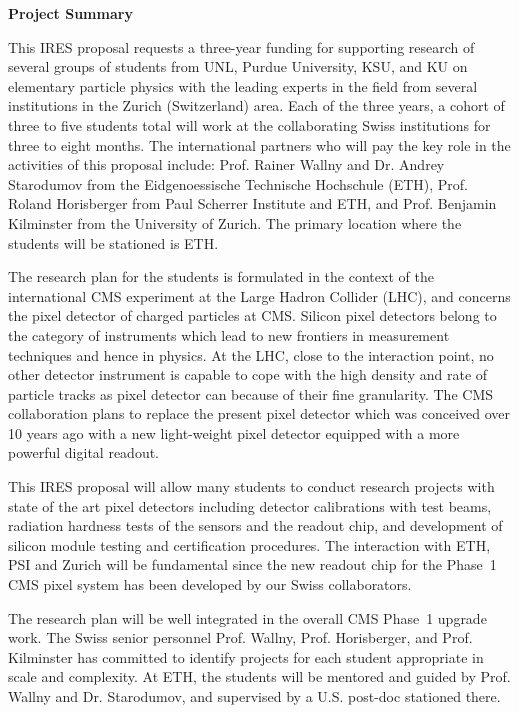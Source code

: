 \documentclass[12pt]{article}
\begin{document}
\pagestyle{empty}

\begin{center}
{\large\bf Project Summary}
\end{center}

This IRES proposal requests a three-year funding for supporting
research of several groups of students from UNL, Purdue University,
KSU, and KU on elementary particle physics with the leading experts in
the field from several institutions in the Zurich (Switzerland)
area. Each of the three years, a cohort of three to five students
total will work at the collaborating Swiss institutions for three to
eight months. The international partners who will pay the key role in
the activities of this proposal include: Prof. Rainer Wallny and
Dr. Andrey Starodumov from the Eidgenoessische Technische Hochschule
(ETH), Prof. Roland Horisberger from Paul Scherrer Institute and ETH,
and Prof. Benjamin Kilminster from the University of Zurich. The
primary location where the students will be stationed is ETH.

The research plan for the students is formulated in the context of the
international CMS experiment at the Large Hadron Collider (LHC), and
concerns the pixel detector of charged particles at CMS. Silicon pixel
detectors belong to the category of instruments which lead to new
frontiers in measurement techniques and hence in physics. At the LHC,
close to the interaction point, no other detector instrument is
capable to cope with the high density and rate of particle tracks as
pixel detector can because of their fine granularity. The CMS
collaboration plans to replace the present pixel detector which was
conceived over 10 years ago
with a new
light-weight pixel detector equipped with a more powerful digital
readout.

This IRES proposal will allow many students to conduct research
projects with state of the art pixel detectors including detector
calibrations with test beams, radiation hardness tests of the sensors
and the readout chip, and development of silicon module testing and
certification procedures. The interaction with ETH, PSI and Zurich
will be fundamental since the new readout chip for the Phase~1 CMS
pixel system has been developed by our Swiss collaborators.

The research plan will be well integrated in the overall CMS Phase~1
upgrade work. The Swiss senior personnel Prof. Wallny,
Prof. Horisberger, and Prof. Kilminster has committed to identify
projects for each student appropriate in scale and complexity. At ETH,
the students will be mentored and guided by Prof. Wallny and
Dr. Starodumov, and supervised by a U.S. post-doc stationed there.
\end{document}
